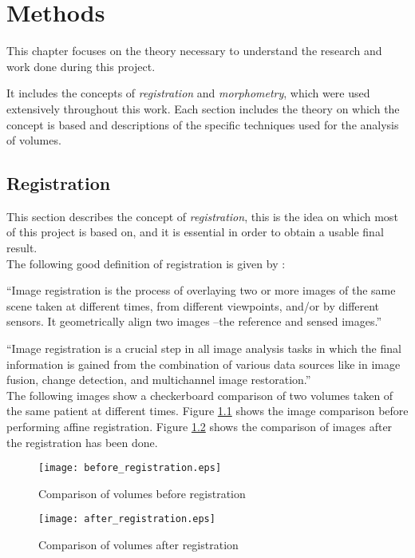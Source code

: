 \chapter{Methods}
This chapter focuses on the theory necessary to understand the
research and work done during this project.

It includes the concepts of \textit{registration} and
\textit{morphometry}, which were used extensively throughout this
work. Each section includes the theory on which the concept is based
and descriptions of the specific techniques used for the analysis of
volumes.

\section{Registration}
This section describes the concept of \textit{registration}, this is
the idea on which most of this project is based on, and it is
essential in order to obtain a usable final result.\\

The following good definition of registration is given by
\cite{zitova}:

``Image registration is the process of overlaying two or more images
of the same scene taken at different times, from different viewpoints,
and/or by different sensors. It geometrically align two images --the
reference and sensed images.''

``Image registration is a crucial step in all image analysis tasks in
which the final information is gained from the combination of various
data sources like in image fusion, change detection, and multichannel
image restoration.''\\


The following images show a checkerboard comparison of two volumes
taken of the same patient at different times. Figure \ref{before_reg}
shows the image comparison before performing affine
registration. Figure \ref{after_reg} shows the comparison of images
after the registration has been done.

\begin{figure}[htb]
  \centering
  \texttt{[image: before\_registration.eps]}
  \caption{Comparison of volumes before registration}
  \label{before_reg}
\end{figure}


\begin{figure}[htb]
  \centering
  \texttt{[image: after\_registration.eps]}
  \caption{Comparison of volumes after registration}
  \label{after_reg}
\end{figure}

